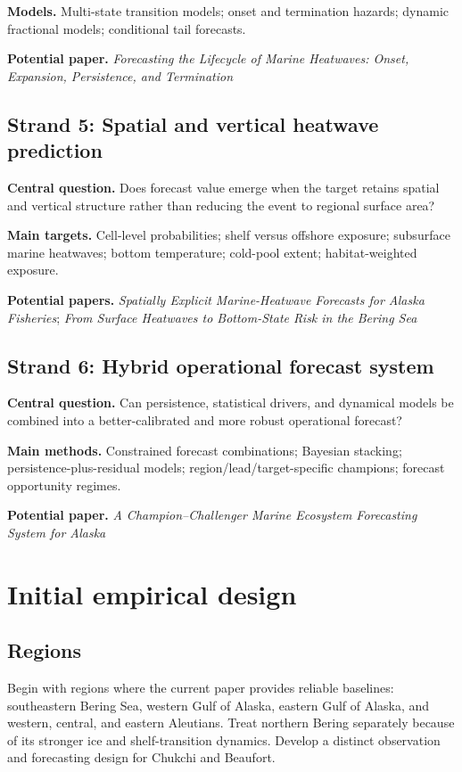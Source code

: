 \documentclass[11pt]{article}
\newcommand{\MHWs}{marine heatwaves}
\begin{document}
\textbf{Models.} Multi-state transition models; onset and termination hazards; dynamic fractional models; conditional tail forecasts.

\textbf{Potential paper.} \emph{Forecasting the Lifecycle of Marine Heatwaves: Onset, Expansion, Persistence, and Termination}

\subsection{Strand 5: Spatial and vertical heatwave prediction}

\textbf{Central question.} Does forecast value emerge when the target retains spatial and vertical structure rather than reducing the event to regional surface area?

\textbf{Main targets.} Cell-level probabilities; shelf versus offshore exposure; subsurface \MHWs{}; bottom temperature; cold-pool extent; habitat-weighted exposure.

\textbf{Potential papers.} \emph{Spatially Explicit Marine-Heatwave Forecasts for Alaska Fisheries}; \emph{From Surface Heatwaves to Bottom-State Risk in the Bering Sea}

\subsection{Strand 6: Hybrid operational forecast system}

\textbf{Central question.} Can persistence, statistical drivers, and dynamical models be combined into a better-calibrated and more robust operational forecast?

\textbf{Main methods.} Constrained forecast combinations; Bayesian stacking; persistence-plus-residual models; region/lead/target-specific champions; forecast opportunity regimes.

\textbf{Potential paper.} \emph{A Champion--Challenger Marine Ecosystem Forecasting System for Alaska}

\section{Initial empirical design}

\subsection{Regions}

Begin with regions where the current paper provides reliable baselines: southeastern Bering Sea, western Gulf of Alaska, eastern Gulf of Alaska, and western, central, and eastern Aleutians. Treat northern Bering separately because of its stronger ice and shelf-transition dynamics. Develop a distinct observation and forecasting design for Chukchi and Beaufort.
\end{document}

